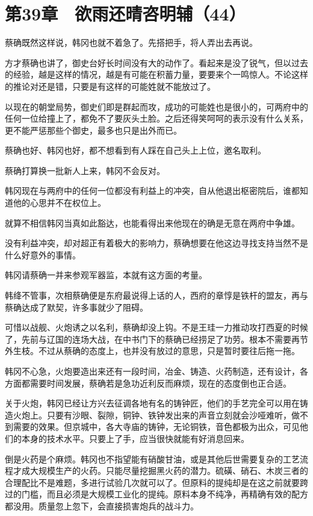 \section{第39章　欲雨还晴咨明辅（44）}

蔡确既然这样说，韩冈也就不着急了。先搭把手，将人弄出去再说。

方才蔡确也讲了，御史台好长时间没有大的动作了。看起来是没了锐气，但以过去的经验，越是这样的情况，越是有可能在积蓄力量，要要来个一鸣惊人。不论这样的推论对还是错，只要是有这样的可能姓就不能放过了。

以现在的朝堂局势，御史们即是群起而攻，成功的可能姓也是很小的，可两府中的任何一位给撞上了，都免不了要灰头土脸。之后还得笑呵呵的表示没有什么关系，更不能严惩那些个御史，最多也只是出外而已。

蔡确也好、韩冈也好，都不想看到有人踩在自己头上上位，邀名取利。

蔡确打算换一批新人上来，韩冈不会反对。

韩冈现在与两府中的任何一位都没有利益上的冲突，自从他退出枢密院后，谁都知道他的心思并不在权位上。

就算不相信韩冈当真如此豁达，也能看得出来他现在的确是无意在两府中争雄。

没有利益冲突，却对超正有着极大的影响力，蔡确想要在他这边寻找支持当然不是什么好意外的事情。

韩冈请蔡确一并来参观军器监，本就有这方面的考量。

韩绛不管事，次相蔡确便是东府最说得上话的人，西府的章惇是铁杆的盟友，再与蔡确达成了默契，许多事就少了阻碍。

可惜以战舰、火炮诱之以名利，蔡确却没上钩。不是王珪一力推动攻打西夏的时候了，先前与辽国的连场大战，在中书门下的蔡确已经捞足了功劳。根本不需要再节外生枝。不过从蔡确的态度上，也并没有放过的意思，只是暂时要往后拖一拖。

韩冈不心急，火炮要造出来还有一段时间，冶金、铸造、火药制造，还有设计，各方面都需要时间发展，蔡确若是急功近利反而麻烦，现在的态度倒也正合适。

关于火炮，韩冈已经让方兴去征调各地有名的铸钟匠，他们的手艺完全可以用在铸造火炮上。只要有沙眼、裂隙，铜钟、铁钟发出来的声音立刻就会沙哑难听，做不到需要的效果。但京城中，各大寺庙的铸钟，无论铜铁，音色都极为出众，可见他们的本身的技术水平。只要上了手，应当很快就能有好消息回来。

倒是火药是个麻烦。韩冈也不指望能有硝酸甘油，或是其他后世需要复杂的工艺流程才成大规模生产的火药。只能尽量挖掘黑火药的潜力。硫磺、硝石、木炭三者的合理配比不是难题，多进行试验几次就可以了。但原料的提纯却是在这之前就要跨过的门槛，而且必须是大规模工业化的提纯。原料本身不纯净，再精确有效的配方都没用。质量忽上忽下，会直接损害炮兵的战斗力。

